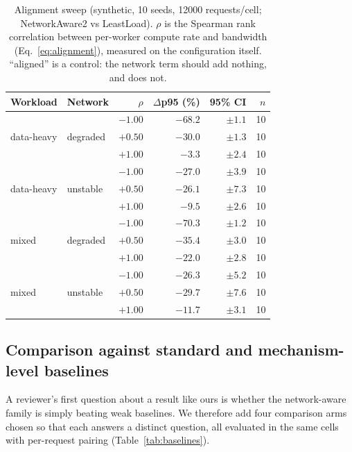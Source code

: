 \begin{table}[t]
\centering
\caption{Alignment sweep (synthetic, 10 seeds, 12000 requests/cell; NetworkAware2 vs
LeastLoad). $\rho$ is the Spearman rank correlation between per-worker compute rate and
bandwidth (Eq.~\ref{eq:alignment}), measured on the configuration itself. ``aligned'' is a
control: the network term should add nothing, and does not.}
\label{tab:alignment}
\small
\begin{tabular}{@{}llrrrr@{}}
\toprule
Workload & Network & $\rho$ & $\Delta$p95 (\%) & 95\% CI & $n$ \\
\midrule
\multirow{3}{*}{data-heavy} & \multirow{3}{*}{degraded}
  & $-1.00$ & $-68.2$ & $\pm1.1$ & 10 \\
  & & $+0.50$ & $-30.0$ & $\pm1.3$ & 10 \\
  & & $+1.00$ & $-3.3$ & $\pm2.4$ & 10 \\
\multirow{3}{*}{data-heavy} & \multirow{3}{*}{unstable}
  & $-1.00$ & $-27.0$ & $\pm3.9$ & 10 \\
  & & $+0.50$ & $-26.1$ & $\pm7.3$ & 10 \\
  & & $+1.00$ & $-9.5$ & $\pm2.6$ & 10 \\
\multirow{3}{*}{mixed} & \multirow{3}{*}{degraded}
  & $-1.00$ & $-70.3$ & $\pm1.2$ & 10 \\
  & & $+0.50$ & $-35.4$ & $\pm3.0$ & 10 \\
  & & $+1.00$ & $-22.0$ & $\pm2.8$ & 10 \\
\multirow{3}{*}{mixed} & \multirow{3}{*}{unstable}
  & $-1.00$ & $-26.3$ & $\pm5.2$ & 10 \\
  & & $+0.50$ & $-29.7$ & $\pm7.6$ & 10 \\
  & & $+1.00$ & $-11.7$ & $\pm3.1$ & 10 \\
\bottomrule
\end{tabular}
\end{table}

\subsection{Comparison against standard and mechanism-level baselines}
\label{sec:rq1:baselines}
A reviewer's first question about a result like ours is whether the network-aware family is simply
beating weak baselines. We therefore add four comparison arms chosen so that each answers a
distinct question, all evaluated in the same cells with per-request pairing
(Table~\ref{tab:baselines}).

